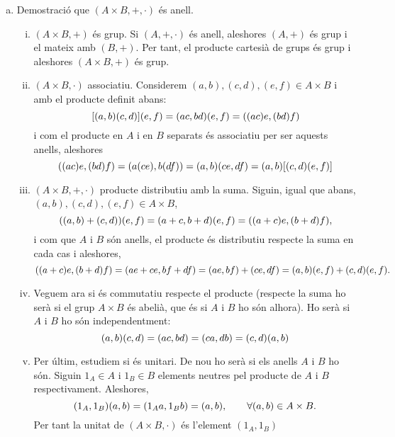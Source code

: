 \documentclass[../main.tex]{subfiles}
\begin{document}
\begin{enumerate}[(a)]
    \item Demostració que $(A\times B,+,\cdotp)$ és anell.
    \begin{enumerate}[(i)]
        \item $(A\times B,+)$ és grup. Si $(A,+,\cdotp )$ és anell, aleshores $(A,+)$ és grup i el mateix amb $(B,+)$. Per tant, el producte cartesià de grups és grup i aleshores $(A\times B,+)$ és grup.
        \item $(A\times B,\cdotp)$ associatiu. Considerem $(a,b),(c,d),(e,f)\in A\times B$ i amb el producte definit abans:
        \begin{equation}
            \notag
            [(a,b)(c,d)](e,f)=(ac,bd)(e,f)=((ac)e,(bd)f)
        \end{equation}
        i com el producte en $A$ i en $B$ separats és associatiu per ser aquests anells, aleshores
        \begin{equation}
            \notag
            ((ac)e,(bd)f)=(a(ce),b(df))=(a,b)(ce,df)=(a,b)[(c,d)(e,f)]
        \end{equation}
        
        \item $(A\times B,+,\cdotp)$ producte distributiu amb la suma. Siguin, igual que abans, $(a,b),(c,d),(e,f)\in A\times B$, 
        \begin{equation}
            \notag
            ((a,b)+(c,d))(e,f)=(a+c,b+d)(e,f)=((a+c)e,(b+d)f),
        \end{equation}
        i com que $A$ i $B$ són anells, el producte és distributiu respecte la suma en cada cas i aleshores, 
        \begin{equation}
            \notag
            ((a+c)e,(b+d)f) = (ae+ce,bf+df)=(ae,bf)+(ce,df)=(a,b)(e,f)+(c,d)(e,f).
        \end{equation}
        
        \item Veguem ara si és commutatiu respecte el producte (respecte la suma ho serà si el grup $A\times B$ és abelià, que és si $A$ i $B$ ho són alhora). Ho serà si $A$ i $B$ ho són independentment:
        \begin{equation}
            \notag
            (a,b)(c,d)=(ac,bd)=(ca,db)=(c,d)(a,b)
        \end{equation}
        \item Per últim, estudiem si és unitari. De nou ho serà si els anells $A$ i $B$ ho són. Siguin $1_A\in A$ i $1_B\in B$ elements neutres pel producte de $A$ i $B$ respectivament. Aleshores, 
        \begin{equation}
            \notag
            (1_A,1_B)(a,b)=(1_Aa,1_Bb)=(a,b),\qquad \forall (a,b)\in A\times B.
        \end{equation}
        Per tant la unitat de $(A\times B, \cdotp )$ és l'element $(1_A,1_B)$
    \end{enumerate}
    

\end{enumerate}
\end{document}
